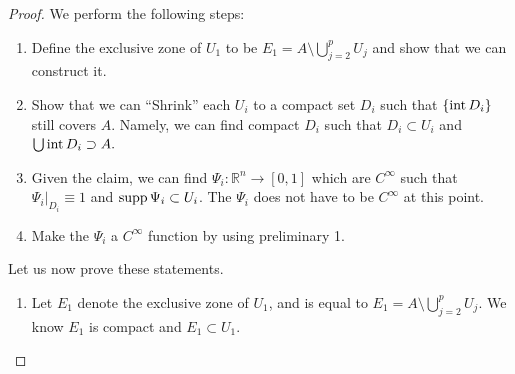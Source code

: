 \documentclass{article}
\numberwithin{equation}{section}
\begin{document}
\begin{proof}
    We perform the following steps: 
    \begin{enumerate}
        \item Define the exclusive zone of $U_1$ to be $E_1 = A \setminus \bigcup_{j=2}^p U_j$ and show that we can construct it.
        \item Show that we can ``Shrink'' each $U_i$ to a compact set $D_i$ such that $\{\operatorname{int} D_i\}$ still covers $A$. Namely, we can find compact $D_i$ such that $D_i \subset U_i$ and $\bigcup \operatorname{int} D_i \supset A.$
        \item Given the claim, we can find $\Psi_i:\mathbb{R}^n \to [0,1]$ which are $C^\infty$ such that $\Psi_i|_{D_i} \equiv 1$ and $\operatorname{supp} \Psi_i \subset U_i$. The $\Psi_i$ does not have to be $C^\infty$ at this point.
        \item Make the $\Psi_i$ a $C^\infty$ function by using preliminary 1.
    \end{enumerate}
    Let us now prove these statements.
    \begin{enumerate}
        \item Let $E_1$ denote the exclusive zone of $U_1$, and is equal to $E_1 = A \setminus \bigcup_{j=2}^p U_j.$ We know $E_1$ is compact and $E_1 \subset U_1.$
        

\end{enumerate}
\end{proof}
\end{document}
